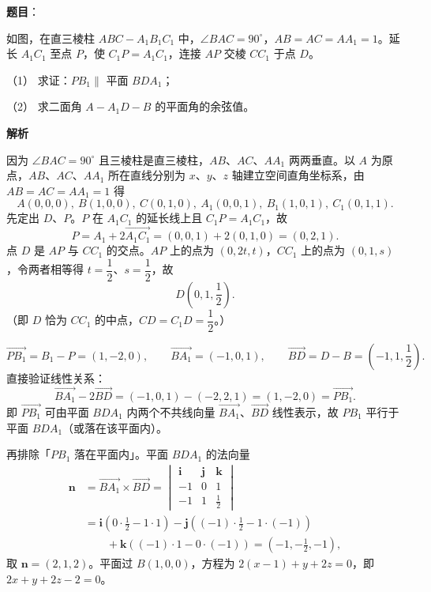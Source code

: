 \begin{answer}

\textbf{题目}：

如图，在直三棱柱 $ABC-A_1B_1C_1$ 中，$\angle BAC=90^\circ$，$AB=AC=AA_1=1$。延长 $A_1C_1$ 至点 $P$，使 $C_1P=A_1C_1$，连接 $AP$ 交棱 $CC_1$ 于点 $D$。

（1） 求证：$PB_1\parallel$ 平面 $BDA_1$；

（2） 求二面角 $A-A_1D-B$ 的平面角的余弦值。
\nopagebreak[4]
\begin{center}\end{center}
\nopagebreak[4]
\textbf{解析}

因为 $\angle BAC=90^\circ$ 且三棱柱是直三棱柱，$AB$、$AC$、$AA_1$ 两两垂直。以 $A$ 为原点，$AB$、$AC$、$AA_1$ 所在直线分别为 $x$、$y$、$z$ 轴建立空间直角坐标系，由 $AB=AC=AA_1=1$ 得
\nopagebreak[4]
\[
A(0,0,0),\ B(1,0,0),\ C(0,1,0),\ A_1(0,0,1),\ B_1(1,0,1),\ C_1(0,1,1).
\]
先定出 $D$、$P$。$P$ 在 $A_1C_1$ 的延长线上且 $C_1P=A_1C_1$，故
\nopagebreak[4]
\[
P=A_1+2\overrightarrow{A_1C_1}=(0,0,1)+2(0,1,0)=(0,2,1).
\]
点 $D$ 是 $AP$ 与 $CC_1$ 的交点。$AP$ 上的点为 $(0,2t,t)$，$CC_1$ 上的点为 $(0,1,s)$，令两者相等得 $t=\dfrac12$、$s=\dfrac12$，故
\nopagebreak[4]
\[
D\left(0,1,\frac12\right).
\]
（即 $D$ 恰为 $CC_1$ 的中点，$CD=C_1D=\dfrac12$。）


\nopagebreak[4]
\[
\overrightarrow{PB_1}=B_1-P=(1,-2,0),\qquad
\overrightarrow{BA_1}=(-1,0,1),\qquad
\overrightarrow{BD}=D-B=\left(-1,1,\frac12\right).
\]
直接验证线性关系：
\nopagebreak[4]
\[
\overrightarrow{BA_1}-2\overrightarrow{BD}=(-1,0,1)-(-2,2,1)=(1,-2,0)=\overrightarrow{PB_1}.
\]
即 $\overrightarrow{PB_1}$ 可由平面 $BDA_1$ 内两个不共线向量 $\overrightarrow{BA_1}$、$\overrightarrow{BD}$ 线性表示，故 $PB_1$ 平行于平面 $BDA_1$（或落在该平面内）。

再排除「$PB_1$ 落在平面内」。平面 $BDA_1$ 的法向量
\nopagebreak[4]
\[
\begin{aligned}
\boldsymbol n&=\overrightarrow{BA_1}\times\overrightarrow{BD}
=\begin{vmatrix}\boldsymbol i&\boldsymbol j&\boldsymbol k\\ -1&0&1\\ -1&1&\frac12\end{vmatrix}\\
&=\boldsymbol i\left(0\cdot\frac12-1\cdot1\right)
-\boldsymbol j\left((-1)\cdot\frac12-1\cdot(-1)\right)\\
&\qquad+\boldsymbol k\left((-1)\cdot1-0\cdot(-1)\right)
=\left(-1,-\frac12,-1\right),
\end{aligned}
\]
取 $\boldsymbol n=(2,1,2)$。平面过 $B(1,0,0)$，方程为 $2(x-1)+y+2z=0$，即 $2x+y+2z-2=0$。


\end{answer}
